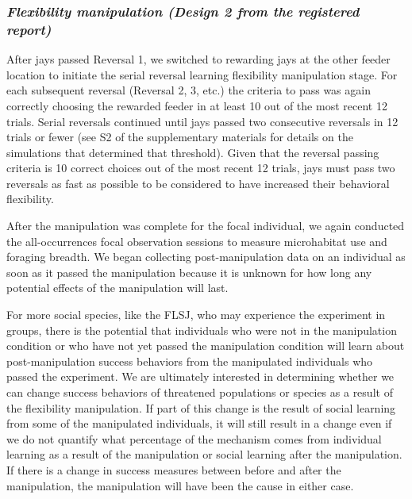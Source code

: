 \documentclass[
]{article}
\begin{document}
\subsubsection{\texorpdfstring{\emph{Flexibility manipulation (Design 2
from the registered
report)}}{Flexibility manipulation (Design 2 from the registered report)}}\label{flexibility-manipulation-design-2-from-the-registered-report}

After jays passed Reversal 1, we switched to rewarding jays at the other
feeder location to initiate the serial reversal learning flexibility
manipulation stage. For each subsequent reversal (Reversal 2, 3, etc.)
the criteria to pass was again correctly choosing the rewarded feeder in
at least 10 out of the most recent 12 trials. Serial reversals continued
until jays passed two consecutive reversals in 12 trials or fewer (see
S2 of the supplementary materials for details on the simulations that
determined that threshold). Given that the reversal passing criteria is
10 correct choices out of the most recent 12 trials, jays must pass two
reversals as fast as possible to be considered to have increased their
behavioral flexibility.

After the manipulation was complete for the focal individual, we again
conducted the all-occurrences focal observation sessions to measure
microhabitat use and foraging breadth. We began collecting
post-manipulation data on an individual as soon as it passed the
manipulation because it is unknown for how long any potential effects of
the manipulation will last.

For more social species, like the FLSJ, who may experience the
experiment in groups, there is the potential that individuals who were
not in the manipulation condition or who have not yet passed the
manipulation condition will learn about post-manipulation success
behaviors from the manipulated individuals who passed the experiment. We
are ultimately interested in determining whether we can change success
behaviors of threatened populations or species as a result of the
flexibility manipulation. If part of this change is the result of social
learning from some of the manipulated individuals, it will still result
in a change even if we do not quantify what percentage of the mechanism
comes from individual learning as a result of the manipulation or social
learning after the manipulation. If there is a change in success
measures between before and after the manipulation, the manipulation
will have been the cause in either case.
\end{document}
